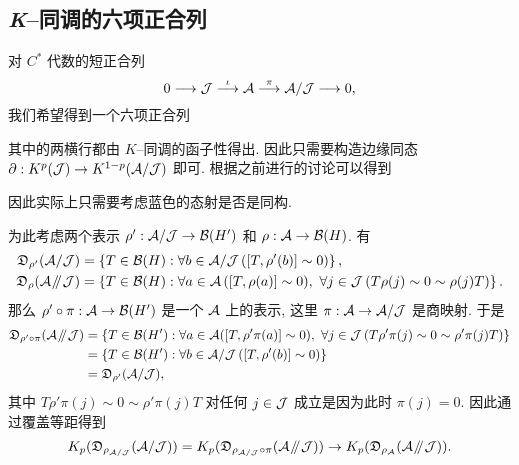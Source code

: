 \subsection{\textit{K}--同调的六项正合列}

对 $ C^* $ 代数的短正合列
\[
	0\longrightarrow \mathcal{J}\stackrel{\iota}{\longrightarrow}\mathcal{A}\stackrel{\pi}{\longrightarrow}\mathcal{A}/\mathcal{J}\longrightarrow 0,
\]
我们希望得到一个六项正合列
\begin{center}
\end{center}
其中的两横行都由 $ K $--同调的函子性得出. 因此只需要构造边缘同态 $ \partial : K^p(\mathcal{J})\to K^{1-p}(\mathcal{A}/\mathcal{J}) $ 即可. 根据之前进行的讨论可以得到
\begin{center}
\end{center}
因此实际上只需要考虑蓝色的态射是否是同构.

为此考虑两个表示 $ \rho' : \mathcal{A}/\mathcal{J}\to\mathcal{B}(H') $ 和 $ \rho : \mathcal{A}\to\mathcal{B}(H) $. 有
\[
	\begin{aligned}
		\mathfrak{D}_{\rho'}(\mathcal{A}/\mathcal{J})&=\left\{ T\in\mathcal{B}(H) : \forall b\in\mathcal{A}/\mathcal{J}\,([T,\rho'(b)]\sim 0) \right\},\\
		\mathfrak{D}_{\rho}(\mathcal{A}\mathbin{\!/\mkern-5mu/\!}\mathcal{J})&=\left\{ T\in\mathcal{B}(H) : \forall a\in\mathcal{A}\,([T,\rho(a)]\sim 0),\ \forall j\in\mathcal{J}\,(T\rho(j)\sim 0\sim \rho(j)T) \right\}.
	\end{aligned}
\]
那么 $ \rho'\circ\pi : \mathcal{A}\to\mathcal{B}(H') $ 是一个 $ \mathcal{A} $ 上的表示, 这里 $ \pi : \mathcal{A}\to\mathcal{A}/\mathcal{J} $ 是商映射. 于是
\[
	\begin{aligned}
		\mathfrak{D}_{\rho'\circ\pi}(\mathcal{A}\mathbin{\!/\mkern-5mu/\!}\mathcal{J})&=\left\{ T\in\mathcal{B}(H') : \forall a\in\mathcal{A}([T,\rho'\pi(a)]\sim 0),\ \forall j\in\mathcal{J}\,(T\rho'\pi(j)\sim 0\sim\rho'\pi(j)T) \right\}\\
		&=\left\{ T\in\mathcal{B}(H') : \forall b\in\mathcal{A}/\mathcal{J}\,([T,\rho'(b)]\sim 0) \right\}\\
		&=\mathfrak{D}_{\rho'}(\mathcal{A}/\mathcal{J}),
	\end{aligned}
\]
其中 $ T\rho'\pi(j)\sim 0\sim\rho'\pi(j)T $ 对任何 $ j\in\mathcal{J} $ 成立是因为此时 $ \pi(j)=0 $. 因此通过覆盖等距得到
\[
	K_p(\mathfrak{D}_{\rho_{\mathcal{A}/\mathcal{J}}}(\mathcal{A}/\mathcal{J}))=K_p(\mathfrak{D}_{\rho_{\mathcal{A}/\mathcal{J}}\circ\pi}(\mathcal{A}\mathbin{\!/\mkern-5mu/\!}\mathcal{J}))\to K_p(\mathfrak{D}_{\rho_{\mathcal{A}}}(\mathcal{A}\mathbin{\!/\mkern-5mu/\!}\mathcal{J})).
\]

